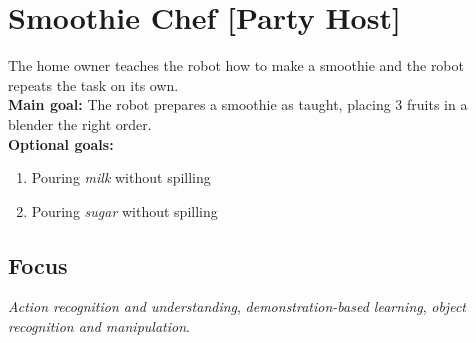 \section{Smoothie Chef [Party Host]}
\label{test:smoothie-chef}
The home owner teaches the robot how to make a smoothie and the robot repeats the task on its own.\\

\noindent \textbf{Main goal:} The robot prepares a smoothie as taught, placing 3 fruits in a blender the right order.\\

\noindent \textbf{Optional goals:}
\begin{enumerate}[nosep]
	\item Pouring \emph{milk} without spilling
	\item Pouring \emph{sugar} without spilling
\end{enumerate}


\subsection*{Focus}
\emph{Action recognition and understanding}, \emph{demonstration-based learning}, \emph{object recognition and manipulation}.

